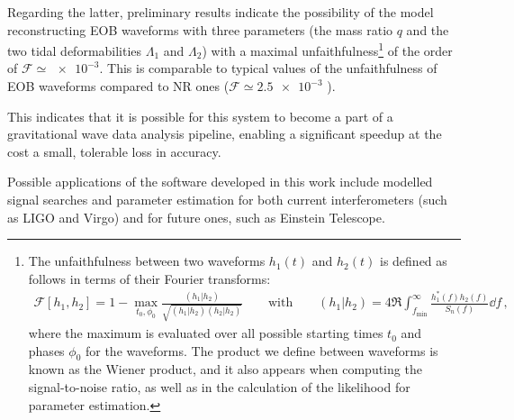 \documentclass[11pt]{article}
\begin{document}
Regarding the latter, preliminary results indicate the possibility of the model reconstructing \ac{EOB} waveforms with three parameters (the mass ratio \(q\) and the two tidal deformabilities \(\Lambda_1\) and \(\Lambda_2 \)) with a maximal unfaithfulness\footnote{The unfaithfulness between two waveforms \(h_1 (t)\) and \(h_2(t) \) is defined as follows in terms of their Fourier transforms: 
%
\begin{align}
\mathcal{F} [h_1 , h_2 ] = 1 - \max_{t_0, \phi_0 } \frac{(h_1 | h_2 )}{\sqrt{(h_1 | h_2 ) (h_2 | h_2 )}}
\qquad \text{with} \qquad
(h_1 | h_2 ) = 4 \Re \int_{f _{\text{min}}}^{\infty } \frac{h_1^{*} (f) h_2 (f)}{S_n (f)} \dd{f}
\,,
\end{align}
%
where the maximum is evaluated over all possible starting times \(t_0 \) and phases \(\phi_0 \) for the waveforms. The product we define between waveforms is known as the Wiener product, and it also appears when computing the signal-to-noise ratio, as well as in the calculation of the likelihood for parameter estimation. 
} of the order of \(\mathcal{F} \simeq \num{e-3}\).
This is comparable to typical values of the unfaithfulness of EOB waveforms compared to \ac{NR} ones (\(\mathcal{F} \simeq \num{2.5e-3}\) \cite[]{nagarTimedomainEffectiveonebodyGravitational2018}).

This indicates that it is possible for this system to become a part of a gravitational wave data analysis pipeline, enabling a significant speedup at the cost a small, tolerable loss in accuracy.

Possible applications of the software developed in this work include modelled signal searches and parameter estimation for both current interferometers (such as LIGO and Virgo) and for future ones, such as Einstein Telescope.


\printbibliography

\end{document}
